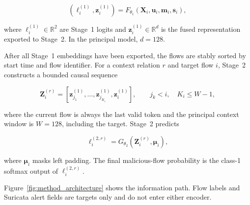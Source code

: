 \documentclass[11pt,fleqn]{report}
\begin{document}
\begin{equation}
    \left(\boldsymbol{\ell}^{(1)}_i,\mathbf{z}^{(1)}_i\right)
    =F_{\theta_1}
    \left(
        \mathbf{X}_i,\mathbf{u}_i,\mathbf{m}_i,\mathbf{s}_i
    \right),
    \label{eq:method_stage1_mapping}
\end{equation}

where $\boldsymbol{\ell}^{(1)}_i\in\mathbb{R}^{2}$ are Stage~1 logits and
$\mathbf{z}^{(1)}_i\in\mathbb{R}^{d}$ is the fused representation exported to
Stage~2. In the principal model, $d=128$.

After all Stage~1 embeddings have been exported, the flows are stably sorted by
start time and flow identifier. For a context relation $r$ and target flow $i$,
Stage~2 constructs a bounded causal sequence

\begin{equation}
    \mathbf{Z}^{(r)}_i=
    \left[
        \mathbf{z}^{(1)}_{j_1},\ldots,
        \mathbf{z}^{(1)}_{j_{K_i}},
        \mathbf{z}^{(1)}_i
    \right],
    \qquad j_k<i,\quad K_i\leq W-1,
    \label{eq:method_stage2_input}
\end{equation}

where the current flow is always the last valid token and the principal context
window is $W=128$, including the target. Stage~2 predicts

\begin{equation}
    \boldsymbol{\ell}^{(2,r)}_i
    =G_{\theta_2}
    \left(\mathbf{Z}^{(r)}_i,\boldsymbol{\mu}_i\right),
    \label{eq:method_stage2_mapping}
\end{equation}

where $\boldsymbol{\mu}_i$ masks left padding. The final malicious-flow
probability is the class-1 softmax output of
$\boldsymbol{\ell}^{(2,r)}_i$.

Figure~\ref{fig:method_architecture} shows the information path. Flow labels
and Suricata alert fields are targets only and do not enter either encoder.
\end{document}
